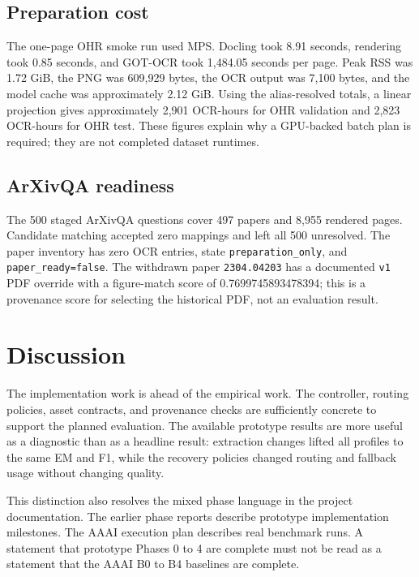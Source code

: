 \documentclass[10pt,twocolumn]{article}
\begin{document}
\subsection{Preparation cost}

The one-page OHR smoke run used MPS. Docling took 8.91 seconds, rendering took 0.85 seconds, and GOT-OCR took 1,484.05 seconds per page. Peak RSS was 1.72 GiB, the PNG was 609,929 bytes, the OCR output was 7,100 bytes, and the model cache was approximately 2.12 GiB. Using the alias-resolved totals, a linear projection gives approximately 2,901 OCR-hours for OHR validation and 2,823 OCR-hours for OHR test. These figures explain why a GPU-backed batch plan is required; they are not completed dataset runtimes.

\subsection{ArXivQA readiness}

The 500 staged ArXivQA questions cover 497 papers and 8,955 rendered pages. Candidate matching accepted zero mappings and left all 500 unresolved. The paper inventory has zero OCR entries, state \texttt{preparation\_only}, and \texttt{paper\_ready=false}. The withdrawn paper \texttt{2304.04203} has a documented \texttt{v1} PDF override with a figure-match score of 0.7699745893478394; this is a provenance score for selecting the historical PDF, not an evaluation result.

\section{Discussion}

The implementation work is ahead of the empirical work. The controller, routing policies, asset contracts, and provenance checks are sufficiently concrete to support the planned evaluation. The available prototype results are more useful as a diagnostic than as a headline result: extraction changes lifted all profiles to the same EM and F1, while the recovery policies changed routing and fallback usage without changing quality.

This distinction also resolves the mixed phase language in the project documentation. The earlier phase reports describe prototype implementation milestones. The AAAI execution plan describes real benchmark runs. A statement that prototype Phases 0 to 4 are complete must not be read as a statement that the AAAI B0 to B4 baselines are complete.
\end{document}
